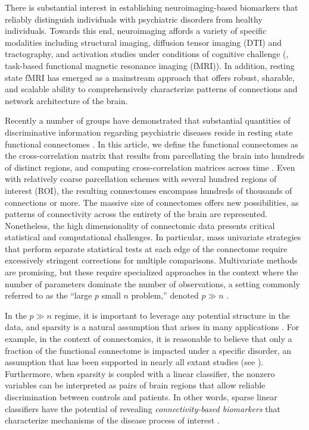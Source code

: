 There is substantial interest in establishing neuroimaging-based biomarkers that reliably distinguish individuals with psychiatric disorders from healthy individuals. 
Towards this end, neuroimaging affords a variety of specific modalities including structural imaging, diffusion tensor imaging (DTI) and tractography, and activation studies under conditions of cognitive challenge (\ie, task-based functional magnetic resonance imaging (fMRI)).
In addition, resting state fMRI has emerged as a mainstream approach that offers robust, sharable, and scalable ability to comprehensively characterize patterns of connections and network architecture of the brain.

Recently a number of groups have demonstrated that substantial quantities of discriminative information regarding psychiatric diseases reside in resting state functional connectomes \citep{Fox:2010,Castellanos:2013}.
In this article, we define the functional connectomes as the cross-correlation matrix that results from parcellating the brain into hundreds of distinct regions, and computing cross-correlation matrices across time \citep{Varoquaux:2013}.
Even with relatively coarse parcellation schemes with several hundred regions of interest (ROI), the resulting connectomes encompass hundreds of thousands of connections or more. 
The massive size of connectomes offers new possibilities, as patterns of connectivity across the entirety of the brain are represented.  
Nonetheless, the high dimensionality of connectomic data presents critical statistical and computational challenges.
In particular, mass univariate strategies that perform separate statistical tests at each edge of the connectome require excessively stringent corrections for multiple comparisons. 
Multivariate methods are promising, but these require specialized approaches in the context where the number of parameters dominate the number of observations, a setting commonly referred to as the ``large $p$ small $n$ problem,'' denoted $p\gg n$ \citep{Buhlmann:2011, West:2003}.

In the $p\gg n$ regime, it is important to leverage any potential structure in the data, and sparsity is a natural assumption that arises in many applications \citep{Candes:2008,Fan:2010}.
For example, in the context of connectomics, it is reasonable to believe that only a fraction of the functional connectome is impacted under a specific disorder, an assumption that has been supported in nearly all extant studies (see \cite{Castellanos:2013}).
Furthermore, when sparsity is coupled with a linear classifier, the nonzero variables can be interpreted as pairs of brain regions that allow reliable discrimination between controls and patients. 
In other words, sparse linear classifiers have the potential of revealing \emph{connectivity-based biomarkers} that characterize mechanisms of the disease process of interest \citep{Atluri:2013}. 

